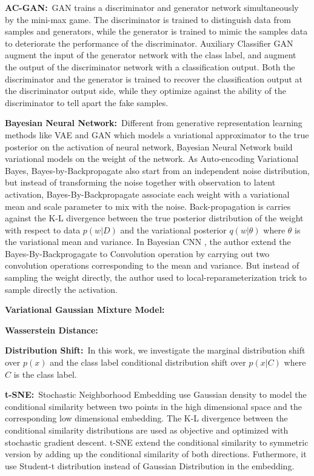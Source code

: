 \documentclass{article}
\begin{document}
\textbf{AC-GAN:}\, GAN \cite{FIXME} trains a discriminator and generator network simultaneously by the mini-max game. The discriminator is trained to distinguish data from samples and generators, while the generator is trained to mimic the samples data to deteriorate the performance of the discriminator. Auxiliary Classifier GAN \cite{FIXME} augment the input of the generator network with the class label, and augment the output of the discriminator network with a classification output. Both the discriminator and the generator is trained to recover the classification output at the discriminator output side, while they optimize against the ability of the discriminator to tell apart the fake samples. 


\textbf{Bayesian Neural Network:}\, Different from generative representation learning methods like VAE \cite{FIXME} and GAN \cite{FIXME} which models a variational approximator to the true posterior on the activation of neural network, Bayesian Neural Network build variational models on the weight of the network. As Auto-encoding Variational Bayes, Bayes-by-Backpropagate \cite{FIXME:Blundel} also start from an independent noise distribution, but instead of transforming the noise together with observation to latent activation, Bayes-By-Backpropagate associate each weight with a variational mean and scale parameter to mix with the noise. Back-propagation is carries against the K-L divergence between the true posterior distribution of the weight with respect to data $p(w|D)$ and the variational posterior $q(w|\theta)$ where $\theta$ is the variational mean and variance. In Bayesian CNN \cite{FIXME}, the author extend the Bayes-By-Backprogagate to Convolution operation by carrying out two convolution operations corresponding to the mean and variance. But instead of sampling the weight directly, the author used to local-reparameterization trick to sample directly the activation.
 
\textbf{Variational Gaussian Mixture Model:}\,

\textbf{Wasserstein Distance:}\,

\textbf{Distribution Shift:}\, In this work, we investigate the marginal distribution shift over $p(x)$ and the class label conditional distribution shift over $p(x|C)$ where $C$ is the class label.

\textbf{t-SNE:\,} Stochastic Neighborhood Embedding \cite{FIXME} use Gaussian density to model the conditional similarity between two points in the high dimensional space and the corresponding low dimensional embedding. The K-L divergence between the conditional similarity distributions are used as objective and optimized with stochastic gradient descent. t-SNE \cite{FIXME} extend the conditional similarity to symmetric version by adding up the conditional similarity of both directions. Futhermore, it use Student-t distribution instead of Gaussian Distribution in the embedding. 
\end{document}
